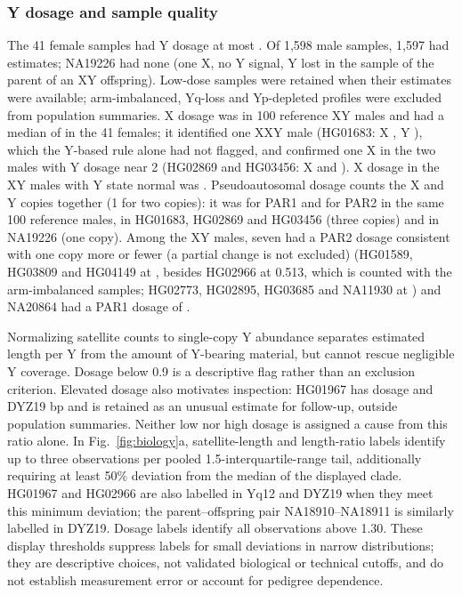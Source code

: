 
\subsubsection{Y dosage and sample quality}\label{sec:res-dosage}
The 41 female samples had Y dosage at most . Of 1,598 male samples, 1,597 had estimates; NA19226 had none (one X, no Y signal, Y lost in the sample of the parent of an XY offspring). Low-dose samples were retained when their estimates were available; arm-imbalanced, Yq-loss and Yp-depleted profiles were excluded from population summaries. X dosage was  in 100 reference XY males and had a median of  in the 41 females; it identified one XXY male (HG01683: X , Y ), which the Y-based rule alone had not flagged, and confirmed one X in the two males with Y dosage near 2 (HG02869 and HG03456: X  and ). X dosage in the  XY males with Y state normal was . Pseudoautosomal dosage counts the X and Y copies together (1 for two copies): it was  for PAR1 and  for PAR2 in the same 100 reference males,  in HG01683, HG02869 and HG03456 (three copies) and  in NA19226 (one copy). Among the XY males, seven had a PAR2 dosage consistent with one copy more or fewer (a partial change is not excluded) (HG01589, HG03809 and HG04149 at , besides HG02966 at 0.513, which is counted with the arm-imbalanced samples; HG02773, HG02895, HG03685 and NA11930 at ) and NA20864 had a PAR1 dosage of .

Normalizing satellite counts to single-copy Y abundance separates estimated length per Y from the amount of Y-bearing material, but cannot rescue negligible Y coverage. Dosage below 0.9 is a descriptive flag rather than an exclusion criterion. Elevated dosage also motivates inspection: HG01967 has dosage  and DYZ19  bp and is retained as an unusual estimate for follow-up, outside population summaries. Neither low nor high dosage is assigned a cause from this ratio alone. In Fig.~\ref{fig:biology}a, satellite-length and length-ratio labels identify up to three observations per pooled 1.5-interquartile-range tail, additionally requiring at least 50\% deviation from the median of the displayed clade. HG01967 and HG02966 are also labelled in Yq12 and DYZ19 when they meet this minimum deviation; the parent--offspring pair NA18910--NA18911 is similarly labelled in DYZ19. Dosage labels identify all observations above 1.30. These display thresholds suppress labels for small deviations in narrow distributions; they are descriptive choices, not validated biological or technical cutoffs, and do not establish measurement error or account for pedigree dependence.

